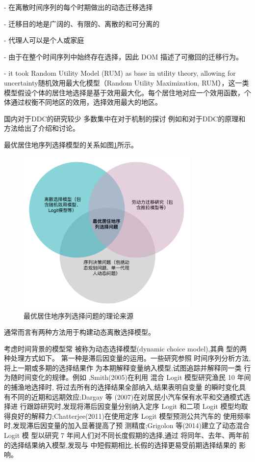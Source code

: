 \documentclass[a4paper,12pt,oneside]{book} %
\begin{document}
- 在离散时间序列的每个时期做出的动态迁移选择

- 迁移目的地是广阔的、有限的、离散的和可分离的

- 代理人可以是个人或家庭

- 由于在整个时间序列中始终存在选择，因此 DOM 描述了可撤回的迁移行为。

- it took Random Utility Model (RUM) as base in utility theory, allowing for uncertainty随机效用最大化模型（Random Utility Maximization, RUM），这一类模型假设个体的居住地选择是基于效用最大化。每个居住地对应一个效用函数，个体通过权衡不同地区的效用，选择效用最大的地区。



国内对于DDC的研究较少
多数集中在对于机制的探讨
例如\cite{QinSongDongTaiChiSanXuanZeMoXingJiQiGuJiFangFaFaZhanZongShu2010}和\cite{MaYaQiDongTaiChiSanXuanZeMoXingDeMoNiFenXi2016}对于DDC的原理和方法给出了介绍和讨论。

最优居住地序列选择模型的关系如图\ref{fig:最优居住地序列选择问题的理论来源venn diagram}所示。

\begin{figure}[!ht]
\centering
\includegraphics[width=0.8\textwidth]{images/optimal_residential_sequence.drawio.pdf}
\caption{最优居住地序列选择问题的理论来源}
\label{fig:最优居住地序列选择问题的理论来源venn diagram}
\end{figure}

通常而言有两种方法用于构建动态离散选择模型。

考虑时间背景的模型常 被称为动态选择模型(dynamic choice model),其典 型的两种处理方式如下。 第一种是滞后因变量的运用。一些研究参照 时间序列分析方法,将上一期或多期的选择结果作 为本期解释变量纳入模型,试图追踪并解释同一类 行为随时间变化的规律。例如
,Smith(2005)在利用 混合 Logit 模型研究渔民 10 年间的捕渔地选择时, 将过去所有的选择结果全部纳入,结果表明自变量 的瞬时变化具有不同的近期和远期效应;Dargay 等 (2007)在对居民小汽车保有水平和交通模式选择进 行跟踪研究时,发现将滞后因变量分别纳入定序 Logit 和二项 Logit 模型均取得良好的解释力;Chatterjee(2011)在使用定序 Logit 模型预测公共汽车的 使用频率时,发现滞后因变量的加入显著提高了预 测精度;Grigolon 等(2014)建立了动态混合 Logit 模 型以研究 7 年间人们对不同长度假期的选择,通过 将同年、去年、两年前的选择结果纳入模型,发现与 中短假期相比,长假的选择更易受前期选择结果的 影响。
\end{document}
